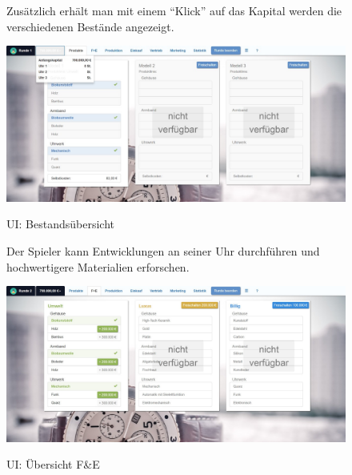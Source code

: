 \begin{figure}
	\begin{minipage}{\textwidth}
Zusätzlich erhält man mit einem \enquote{Klick} auf das Kapital werden die verschiedenen Bestände angezeigt.\\
	\end{minipage}
	\centering
	\includegraphics[scale=0.3]{img/bilder_layout/spieler.jpeg}
	\label{fig:abb16}
	\caption{UI: Bestandsübersicht}
\end{figure}

\begin{figure}
\begin{minipage}{\textwidth}
Der Spieler kann Entwicklungen an seiner Uhr durchführen und hochwertigere Materialien erforschen.\\
\end{minipage}
	\centering
	\includegraphics[scale=0.3]{img/bilder_layout/fe.jpeg}
	\label{fig:abb17}
	\caption{UI: Übersicht F\&E} 
\end{figure}

